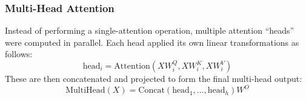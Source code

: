 \subsubsection*{Multi-Head Attention}
Instead of performing a single-attention operation, multiple attention ``heads'' were computed in parallel. Each head applied its own linear transformations as follows:
\begin{equation}
\text{head}_i = \text{Attention}(XW_i^{Q}, XW_i^{K}, XW_i^{V})
\label{dfg-eacff43ea2b9}
\end{equation}
These are then concatenated and projected to form the final multi-head output:
\begin{equation}
\text{MultiHead}(X) = \text{Concat}(\text{head}_1, \dots, \text{head}_h)W^{O}
\label{dfg-b89c61449178}
\end{equation}